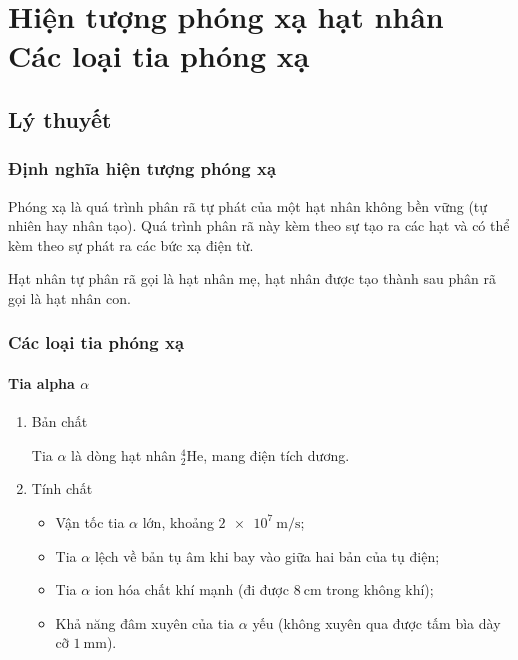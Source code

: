 
\chapter[Hiện tượng phóng xạ hạt nhân \\ Các loại tia phóng xạ]{Hiện tượng phóng xạ hạt nhân\\ Các loại tia phóng xạ}
\section{Lý thuyết}
\subsection{Định nghĩa hiện tượng phóng xạ}
Phóng xạ là quá trình phân rã tự phát của một hạt nhân không bền vững (tự nhiên hay nhân tạo). Quá trình phân rã này kèm theo sự tạo ra các hạt và có thể kèm theo sự phát ra các bức xạ điện từ. 

Hạt nhân tự phân rã gọi là hạt nhân mẹ, hạt nhân được tạo thành sau phân rã gọi là hạt nhân con.
\subsection{Các loại tia phóng xạ}
\subsubsection{Tia alpha $\alpha$}					
\begin{enumerate}[label=\alph*)]
	\item Bản chất
	
	Tia $\alpha$ là dòng hạt nhân $^4_2\text{He}$, mang điện tích dương.
	\item Tính chất
	\begin{itemize}
		\item Vận tốc tia $\alpha$ lớn, khoảng $\SI{2e7}{\meter/\second}$;
		\item Tia $\alpha$ lệch về bản tụ âm khi bay vào giữa hai bản của tụ điện;
		\item Tia $\alpha$ ion hóa chất khí mạnh (đi được $\SI{8}{\centi\meter}$ trong không khí);
		\item Khả năng đâm xuyên của tia $\alpha$ yếu (không xuyên qua được tấm bìa dày cỡ $\SI{1}{\milli\meter}$).
	\end{itemize}
\end{enumerate}
